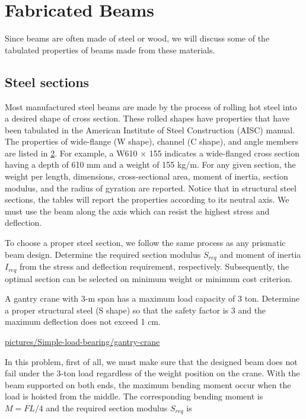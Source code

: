 \documentclass[a4paper,openany,12pt]{book}
\begin{document}
{{\section{Fabricated Beams}
\label{sec:orge3ce1f9}
Since beams are often made of steel or wood, we will discuss some of the
tabulated properties of beams made from these materials.

\subsection{Steel sections}
\label{sec:org04565ee}
Most manufactured steel beams are made by the process of rolling hot
steel into a desired shape of cross section. These rolled shapes have
properties that have been tabulated in the American Institute of Steel
Construction (AISC) manual. The properties of wide-flange (W shape),
channel (C shape), and angle members are listed in
\hyperref[sec:org8775520]{2}. For example, a W610
\(\times\) 155 indicates a wide-flanged cross section having a depth of
610 mm and a weight of 155 kg/m. For any given section, the weight per
length, dimensions, cross-sectional area, moment of inertia, section
modulus, and the radius of gyration are reported. Notice that in
structural steel sections, the tables will report the properties
according to its neutral axis. We must use the beam along the axis which
can resist the highest stress and deflection.


\hspace{1cm}
\hspace{1cm}
\hspace{1cm}
To choose a proper steel section, we follow the same process as any
prismatic beam design. Determine the required section modulus \(S_{req}\)
and moment of inertia \(I_{req}\) from the stress and deflection
requirement, respectively. Subsequently, the optimal section can be
selected on minimum weight or minimum cost criterion.

A gantry crane with 3-m span has a maximum load capacity of 3 ton.
Determine a proper structural steel (S shape) so that the safety factor
is 3 and the maximum deflection does not exceed 1 cm.


\url{pictures/Simple-load-bearing/gantry-crane}

In this problem, first of all, we must make sure that the designed beam
does not fail under the 3-ton load regardless of the weight position on
the crane. With the beam supported on both ends, the maximum bending
moment occur when the load is hoisted from the middle. The corresponding
bending moment is \(M = FL / 4\) and the required section modulus
\(S_{req}\) is

}}
\end{document}
